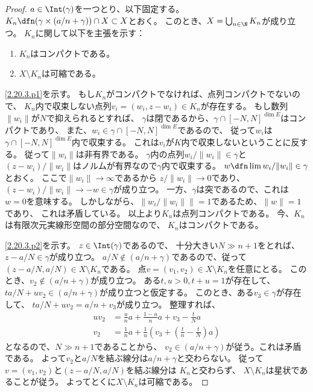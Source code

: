 \documentclass[uplatex,dvipdfmx]{jsarticle}
\begin{document}
\begin{proof}
  \(a\in \Int(\gamma)\)を一つとり、以下固定する。
  \(K_n \dfn (\gamma \times (a/n + \gamma)) \cap X \subset X\)とおく。
  このとき、\(X = \bigcup_{n\in \N}K_n\)が成り立つ。
  \(K_n\)に関して以下を主張を示す：
  \begin{enumerate}[label=(\fnsymbol*),start=2]
    \item \label{2.20.3.p1}
    \(K_n\)はコンパクトである。
    \item \label{2.20.3.p2}
    \(X\setminus K_n\)は可縮である。
  \end{enumerate}
  \ref{2.20.3.p1}を示す。
  もし\(K_n\)がコンパクトでなければ、点列コンパクトでないので、
  \(K_n\)内で収束しない点列\(v_i = (w_i,z-w_i)\in K_n\)が存在する。
  もし数列\(\| w_i\|\)が\(N\)で抑えられるとすれば、
  \(\gamma\)は閉であるから、\(\gamma\cap [-N,N]^{\dim E}\)はコンパクトであり、
  また、\(w_i\in \gamma\cap [-N,N]^{\dim E}\)であるので、
  従って\(w_i\)は\(\gamma\cap [-N,N]^{\dim E}\)内で収束する。
  これは\(v_i\)が\(K\)内で収束しないということに反する。
  従って\(\| w_i\|\)は非有界である。
  \(\gamma\)内の点列\(w_i/\|w_i\|\in \gamma\)と
  \((z-w_i)/\|w_i\|\)はノルムが有界なので\(\gamma\)内で収束する。
  \(w \dfn \lim w_i/\|w_i\|\in \gamma\)とおく。
  ここで\(\|w_i\| \to \infty\)であるから
  \(z/\|w_i\|\to 0\)であり、
  \((z-w_i)/\|w_i\| \to -w\in \gamma\)が成り立つ。
  一方、\(\gamma\)は突であるので、これは\(w = 0\)を意味する。
  しかしながら、\(\|w_i/\|w_i\|\| = 1\)であるため、\(\|w\|=1\)であり、
  これは矛盾している。
  以上より\(K_n\)は点列コンパクトである。
  今、\(K_n\)は有限次元実線形空間の部分空間なので、
  \(K_n\)はコンパクトである。

  \ref{2.20.3.p2}を示す。
  \(z\in \Int(\gamma)\)であるので、
  十分大きい\(N\gg n+1\)をとれば、
  \(z-a/N\in \gamma\)が成り立つ。
  \(a/N\not\in (a/n+\gamma)\)であるので、従って
  \((z-a/N,a/N)\in X\setminus K_n\)である。
  点\(v = (v_1,v_2)\in X\setminus K_n\)を任意にとる。
  このとき、\(v_2\not\in (a/n+\gamma)\)が成り立つ。
  ある\(t,u>0, t+u = 1\)が存在して、
  \(ta/N + uv_2 \in (a/n+\gamma)\)が成り立つと仮定する。
  このとき、ある\(v_3\in \gamma\)が存在して、
  \(ta/N + uv_2 = a/n + v_3\)が成り立つ。
  整理すれば、
  \begin{align*}
    uv_2 &= \frac{u}{n}a + \frac{1-u}{n}a + v_3 - \frac{t}{N}a \\
    v_2 &= \frac{1}{n}a + \frac{1}{u}\left( v_3 +
    \left(\frac{t}{n} - \frac{t}{N}\right)a \right)
  \end{align*}
  となるので、\(N \gg n+1\)であることから、
  \(v_2\in (a/n + \gamma)\)が従う。これは矛盾である。
  よって\(v_2\)と\(a/N\)を結ぶ線分は\(a/n+\gamma\)と交わらない。
  従って\(v=(v_1,v_2)\)と\((z-a/N,a/N)\)を結ぶ線分は
  \(K_n\)と交わらず、
  \(X\setminus K_n\)は星状であることが従う。
  よってとくに\(X\setminus K_n\)は可縮である。


\end{proof}
\end{document}
